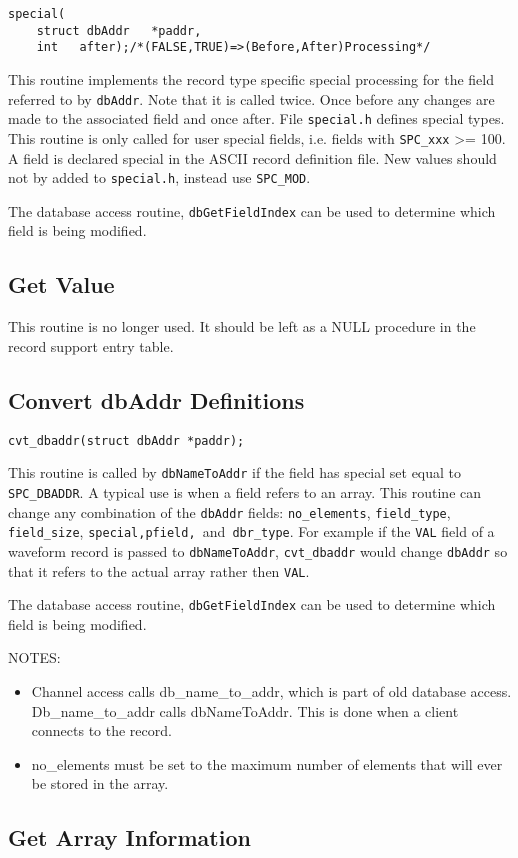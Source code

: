 \begin{verbatim}
special(
    struct dbAddr   *paddr,
    int   after);/*(FALSE,TRUE)=>(Before,After)Processing*/
\end{verbatim}This routine implements the record type specific special processing for the field referred to by \verb|dbAddr|. Note that it is 
called twice. Once before any changes are made to the associated field and once after. File \verb|special.h| defines special 
types. This routine is only called for user special fields, i.e. fields with \verb|SPC_xxx| \textgreater{}= 100. A field is declared special in the 
ASCII record definition file. New values should not by added to \verb|special.h|, instead use \verb|SPC_MOD|.

The database access routine, \verb|dbGetFieldIndex| can be used to determine which field is being modified.

\subsection{Get Value}

This routine is no longer used. It should be left as a NULL procedure in the record support entry table.

\subsection{Convert dbAddr Definitions}

\begin{verbatim}cvt_dbaddr(struct dbAddr *paddr);
\end{verbatim}This routine is called by \verb|dbNameToAddr| if the field has special set equal to \verb|SPC_DBADDR|. A typical use is when a field 
refers to an array. This routine can change any combination of the \verb|dbAddr| fields: \verb|no_elements|, \verb|field_type|, 
\verb|field_size|, \verb|special,pfield, |and\verb| dbr_type|. For example if the \verb|VAL| field of a waveform record is passed to 
\verb|dbNameToAddr|, \verb|cvt_dbaddr| would change \verb|dbAddr| so that it refers to the actual array rather then \verb|VAL|.

The database access routine, \verb|dbGetFieldIndex| can be used to determine which field is being modified.

NOTES:

\begin{itemize}\item Channel access calls db\_name\_to\_addr, which is part of old database access. Db\_name\_to\_addr calls 
dbNameToAddr. This is done when a client connects to the record.

\item no\_elements must be set to the maximum number of elements that will ever be stored in the array.

\end{itemize}\subsection{Get Array Information}

